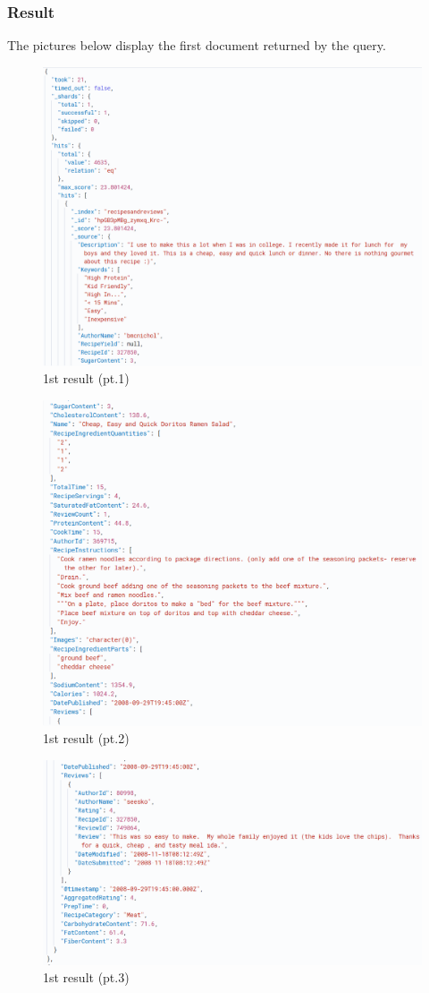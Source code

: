 \begin{enumerate}
    \subsubsection{Result}
    The pictures below display the first document returned by the query.
    \begin{figure}[H]
    \centering
    \includegraphics[width=0.7\linewidth]{Report/ReportLatex/Images/ElasticsearchResults/college1.png}
    \caption{1st result (pt.1)}
    \label{fig:enter-label}
    \end{figure}
    \begin{figure}[H]
    \centering
    \includegraphics[width=0.7\linewidth]{Report/ReportLatex/Images/ElasticsearchResults/college2.png}
    \caption{1st result (pt.2)}
    \label{fig:enter-label}
    \end{figure}
    \begin{figure}[H]
    \centering
    \includegraphics[width=1\linewidth]{Report/ReportLatex/Images/ElasticsearchResults/college3.png}
    \caption{1st result (pt.3)}
    \label{fig:enter-label}
    \end{figure}
\end{enumerate}